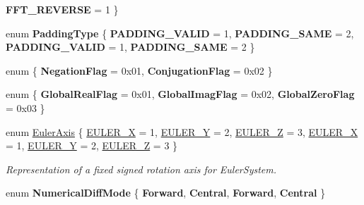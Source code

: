 \begin{DoxyCompactItemize}
{\bfseries F\+F\+T\+\_\+\+R\+E\+V\+E\+R\+SE} = 1
 \}
\item 
\mbox{\label{namespace_eigen_a622216a61db7cda3a723ffd639e2e046}} 
enum {\bfseries Padding\+Type} \{ {\bfseries P\+A\+D\+D\+I\+N\+G\+\_\+\+V\+A\+L\+ID} = 1, 
{\bfseries P\+A\+D\+D\+I\+N\+G\+\_\+\+S\+A\+ME} = 2, 
{\bfseries P\+A\+D\+D\+I\+N\+G\+\_\+\+V\+A\+L\+ID} = 1, 
{\bfseries P\+A\+D\+D\+I\+N\+G\+\_\+\+S\+A\+ME} = 2
 \}
\item 
\mbox{\label{namespace_eigen_a2cea1de463d3606ec56a2efaab0d8a82}} 
enum \{ {\bfseries Negation\+Flag} = 0x01, 
{\bfseries Conjugation\+Flag} = 0x02
 \}
\item 
\mbox{\label{namespace_eigen_a31af940b241bd375c493e1f4c03a341b}} 
enum \{ {\bfseries Global\+Real\+Flag} = 0x01, 
{\bfseries Global\+Imag\+Flag} = 0x02, 
{\bfseries Global\+Zero\+Flag} = 0x03
 \}
\item 
enum \hyperlink{namespace_eigen_ae614aa7cdd687fb5c421a54f2ce5c361}{Euler\+Axis} \{ \newline
\hyperlink{namespace_eigen_ae614aa7cdd687fb5c421a54f2ce5c361ae8110af93d433bfcf247d6bac5e1d387}{E\+U\+L\+E\+R\+\_\+X} = 1, 
\hyperlink{namespace_eigen_ae614aa7cdd687fb5c421a54f2ce5c361a7309edb53a9d9cdb77fac7c1e9200263}{E\+U\+L\+E\+R\+\_\+Y} = 2, 
\hyperlink{namespace_eigen_ae614aa7cdd687fb5c421a54f2ce5c361a0c641fd5050b5219d6c172ac83fb379d}{E\+U\+L\+E\+R\+\_\+Z} = 3, 
\hyperlink{namespace_eigen_ae614aa7cdd687fb5c421a54f2ce5c361ae8110af93d433bfcf247d6bac5e1d387}{E\+U\+L\+E\+R\+\_\+X} = 1, 
\newline
\hyperlink{namespace_eigen_ae614aa7cdd687fb5c421a54f2ce5c361a7309edb53a9d9cdb77fac7c1e9200263}{E\+U\+L\+E\+R\+\_\+Y} = 2, 
\hyperlink{namespace_eigen_ae614aa7cdd687fb5c421a54f2ce5c361a0c641fd5050b5219d6c172ac83fb379d}{E\+U\+L\+E\+R\+\_\+Z} = 3
 \}\begin{DoxyCompactList}\small\item\em Representation of a fixed signed rotation axis for Euler\+System. \end{DoxyCompactList}
\item 
\mbox{\label{namespace_eigen_a53f19342e6b4ecd38ae002d470299add}} 
enum {\bfseries Numerical\+Diff\+Mode} \{ {\bfseries Forward}, 
{\bfseries Central}, 
{\bfseries Forward}, 
{\bfseries Central}
 \}
\item 

\end{DoxyCompactItemize}
